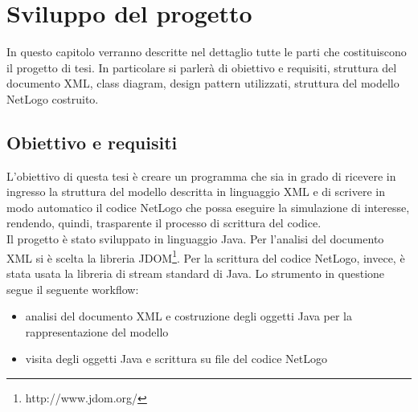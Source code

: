\chapter{Sviluppo del progetto}
In questo capitolo verranno descritte nel dettaglio tutte le parti che costituiscono il progetto di tesi. In particolare si parlerà di obiettivo e requisiti, struttura del documento XML, class diagram, design pattern utilizzati, struttura del modello NetLogo costruito.\\ 

\section{Obiettivo e requisiti}
L'obiettivo di questa tesi è creare un programma che sia in grado di ricevere in ingresso la struttura del modello descritta in linguaggio XML e di scrivere in modo automatico il codice NetLogo che possa eseguire la simulazione di interesse, rendendo, quindi, trasparente il processo di scrittura del codice.\\
Il progetto è stato sviluppato in linguaggio Java. Per l'analisi del documento XML si è scelta la libreria JDOM\footnote{http://www.jdom.org/}. Per la scrittura del codice NetLogo, invece, è stata usata la libreria di stream standard di Java.
Lo strumento in questione segue il seguente workflow:
\begin{itemize}
\item analisi del documento XML e costruzione degli oggetti Java per la rappresentazione del modello
\item visita degli oggetti Java e scrittura su file del codice NetLogo
\end{itemize}

